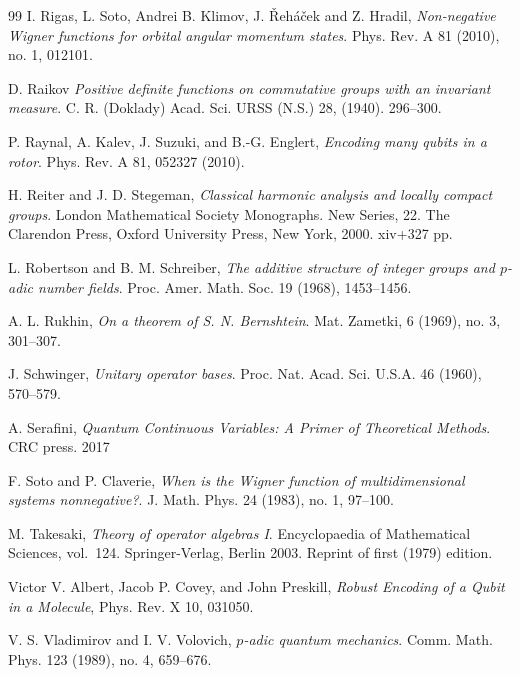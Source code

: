 \documentclass[12pt,reqno]{amsart}
\theoremstyle{definition}
\theoremstyle{definition}
\theoremstyle{definition}
\numberwithin{thm}{section}
\numberwithin{equation}{section}
\begin{document}
\begin{thebibliography}{99}
I. Rigas, L. Soto, Andrei B. Klimov, J. {\v{R}}eh{\'a}{\v{c}}ek and Z. Hradil, 
\textit{Non-negative Wigner functions for orbital angular momentum states}.
Phys. Rev. A 81 (2010), no. 1, 012101.

 D. Raikov
\textit{Positive definite functions on commutative groups with an invariant measure}.
C. R. (Doklady) Acad. Sci. URSS (N.S.) 28, (1940). 296–300.


 P. Raynal, A. Kalev, J. Suzuki, and B.-G. Englert,
\textit{Encoding many qubits in a rotor}.
Phys. Rev. A 81, 052327 (2010).


 H. Reiter and J. D. Stegeman,
\textit{Classical harmonic analysis and locally compact groups}.
London Mathematical Society Monographs. New Series, 22. The Clarendon Press, Oxford University Press, New York, 2000. xiv+327 pp.


 L. Robertson and B. M. Schreiber,
\textit{The additive structure of integer groups and $p$-adic number fields}.
Proc. Amer. Math. Soc. 19 (1968), 1453--1456.

 A. L. Rukhin, 
\textit{On a theorem of S. N. Bernshtein}.
Mat. Zametki, 6 (1969), no. 3, 301--307.

 J. Schwinger,
\textit{Unitary operator bases}.
Proc. Nat. Acad. Sci. U.S.A. 46 (1960), 570--579. 



A. Serafini, 
\textit{Quantum Continuous Variables: A Primer of Theoretical Methods}. 
CRC press. 2017

F. Soto and P. Claverie, 
\textit{When is the Wigner function of multidimensional systems nonnegative?}.
J. Math. Phys. 24 (1983), no. 1, 97--100.

 M. Takesaki,
\textit{Theory of operator algebras I}.
Encyclopaedia of Mathematical Sciences, vol.\ 124. Springer-Verlag, Berlin 2003. Reprint of first (1979) edition.


 Victor V. Albert, Jacob P. Covey, and John Preskill,
\textit{Robust Encoding of a Qubit in a Molecule},
Phys. Rev. X 10, 031050.

V. S. Vladimirov and I. V. Volovich,
\textit{$p$-adic quantum mechanics}.
Comm. Math. Phys. 123 (1989), no. 4, 659--676.


\end{thebibliography}
\end{document}
